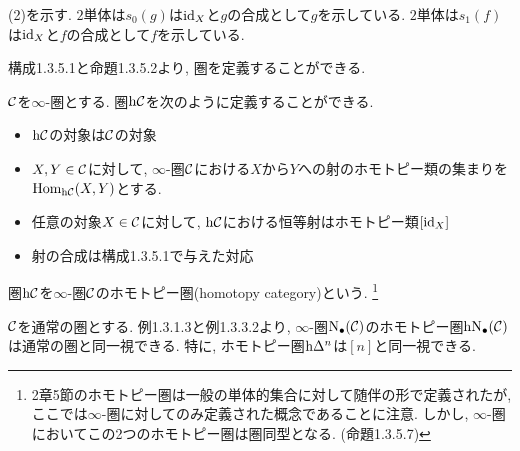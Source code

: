\documentclass[uplatex, a4paper, 14Q, dvipdfmx]{jsreport}
\begin{document}
\begin{Proof}
\begin{center}
  \end{center}
  (2)を示す. 
  $2$単体は$s_0(g)$は$\mathrm{id}_X$と$g$の合成として$g$を示している. 
  $2$単体は$s_1(f)$は$\mathrm{id}_X$と$f$の合成として$f$を示している. 
  \begin{center}
  \end{center}
\end{Proof}

構成1.3.5.1と命題1.3.5.2より, 圏を定義することができる. 

\begin{definition}
  $\mathcal{C}$を$\infty$-圏とする. 
  圏$\mathrm{h} \mathcal{C}$を次のように定義することができる. 
  \begin{itemize}
    \item $\mathrm{h} \mathcal{C}$の対象は$\mathcal{C}$の対象
    \item $X,Y \in \mathcal{C}$に対して, $\infty$-圏$\mathcal{C}$における$X$から$Y$への射のホモトピー類の集まりを$\mathrm{Hom}_{\mathrm{h} \mathcal{C}}(X,Y)$とする. 
    \item 任意の対象$X \in \mathcal{C}$に対して, $\mathrm{h} \mathcal{C}$における恒等射はホモトピー類$[\mathrm{id}_X]$
    \item 射の合成は構成1.3.5.1で与えた対応
  \end{itemize}
  圏$\mathrm{h} \mathcal{C}$を$\infty$-圏$\mathcal{C}$のホモトピー圏(homotopy category)という.
  \footnote{
    2章5節のホモトピー圏は一般の単体的集合に対して随伴の形で定義されたが, ここでは$\infty$-圏に対してのみ定義された概念であることに注意. 
    しかし, $\infty$-圏においてこの2つのホモトピー圏は圏同型となる. (命題1.3.5.7)
  } 
\end{definition}

\begin{example}
  $\mathcal{C}$を通常の圏とする. 
  例1.3.1.3と例1.3.3.2より, $\infty$-圏$\mathrm{N}_{\bullet}(\mathcal{C})$のホモトピー圏$\mathrm{h} \mathrm{N}_{\bullet}(\mathcal{C})$は通常の圏と同一視できる. 
  特に, ホモトピー圏$\mathrm{h} \Delta^n$は$[n]$と同一視できる. 
\end{example}
\end{document}
